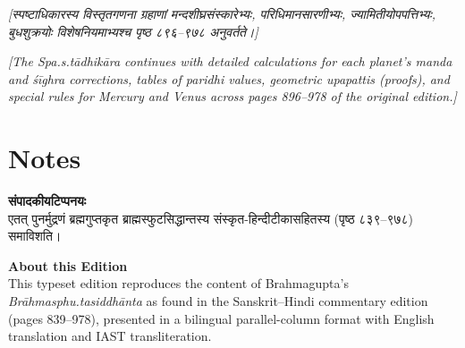 \documentclass[11pt,a4paper]{book}
\newcommand{\dev}[1]{{\devanagarifont #1}}
\newcommand{\bilingual}[2]{%
  \par\vspace{0.6em}%
  \noindent\begin{minipage}[t]{0.48\textwidth}
    \RaggedRight
    #1%
  \end{minipage}%
  \hfill
  \begin{minipage}[t]{0.48\textwidth}
    \RaggedRight
    #2%
  \end{minipage}%
  \par\vspace{0.6em}%
}
\begin{document}
\bilingual{%
\textit{[स्पष्टाधिकारस्य विस्तृतगणना ग्रहाणां मन्दशीघ्रसंस्कारेभ्यः, परिधिमानसारणीभ्यः, ज्यामितीयोपपत्तिभ्यः, बुधशुक्रयोः विशेषनियमाभ्यश्च पृष्ठ ८९६--९७८ अनुवर्तते।]}
}{%
\textit{[The Spa.s.tādhikāra continues with detailed calculations for each planet's \textit{manda} and \textit{śīghra} corrections, tables of \textit{paridhi} values, geometric \textit{upapatti}s (proofs), and special rules for Mercury and Venus across pages 896--978 of the original edition.]}
}

\clearpage

\appendix
\chapter*{Notes}

\bilingual{%
\textbf{\dev{संपादकीयटिप्पनयः}}\\[0.3em]
एतत्‌ पुनर्मुद्रणं ब्रह्मगुप्तकृत ब्राह्मस्फुटसिद्धान्तस्य संस्कृत-हिन्दीटीकासहितस्य (पृष्ठ ८३९--९७८) समाविशति।
}{%
\textbf{About this Edition}\\[0.3em]
This typeset edition reproduces the content of Brahmagupta's \textit{Brāhmasphu.tasiddhānta} as found in the Sanskrit--Hindi commentary edition (pages 839--978), presented in a bilingual parallel-column format with English translation and IAST transliteration.
}

\vspace{1em}
\end{document}
